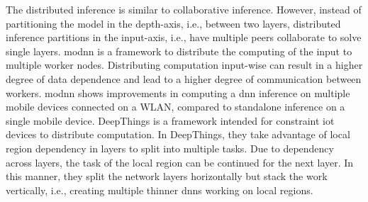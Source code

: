 The distributed inference is similar to collaborative inference. However, instead of partitioning the model in the depth-axis, i.e., between two layers, distributed inference partitions in the input-axis, i.e., have multiple peers collaborate to solve single layers. \gls{modnn} \cite{mao_modnn:_2017} is a framework to distribute the computing of the input to multiple worker nodes. Distributing computation input-wise can result in a higher degree of data dependence and lead to a higher degree of communication between workers. \gls{modnn} shows improvements in computing a \gls{dnn} inference on multiple mobile devices connected on a WLAN, compared to standalone inference on a single mobile device. DeepThings \cite{zhao_deepthings:_2018} is a framework intended for constraint \gls{iot} devices to distribute computation. In DeepThings, they take advantage of local region dependency in layers to split into multiple tasks. Due to dependency across layers, the task of the local region can be continued for the next layer. In this manner, they split the network layers horizontally but stack the work vertically, i.e., creating multiple thinner \gls{dnn}s working on local regions.
